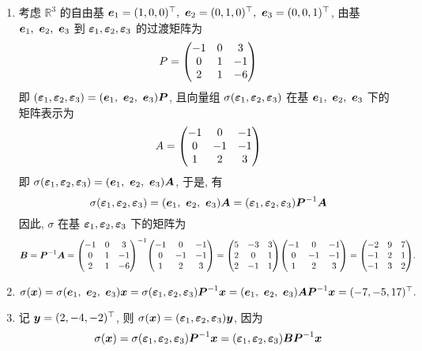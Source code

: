 \begin{solution}
    \begin{enumerate}[label=(\arabic{*})]
        \item 考虑 $\mathbb{R}^3$ 的自由基 $\vb*{e}_1=(1,0,0)^\top,~\vb*{e}_2=(0,1,0)^\top,~\vb*{e}_3=(0,0,1)^\top$, 由基 $\vb*{e}_1,~\vb*{e}_2,~\vb*{e}_3$ 到 $\vb*{\varepsilon}_1,\vb*{\varepsilon}_2,\vb*{\varepsilon}_3$ 的过渡矩阵为
              $$P=\mqty(-1&0&3\\0&1&-1\\2&1&-6)$$
              即 $(\vb*{\varepsilon}_1,\vb*{\varepsilon}_2,\vb*{\varepsilon}_3)=(\vb*{e}_1,~\vb*{e}_2,~\vb*{e}_3)\vb*{P}$, 且向量组 $\sigma(\vb*{\varepsilon}_1,\vb*{\varepsilon}_2,\vb*{\varepsilon}_3)$ 在基 $\vb*{e}_1,~\vb*{e}_2,~\vb*{e}_3$ 下的矩阵表示为
              $$A=\mqty(-1&0&-1\\0&-1&-1\\1&2&3)$$
              即 $\sigma(\vb*{\varepsilon}_1,\vb*{\varepsilon}_2,\vb*{\varepsilon}_3)=(\vb*{e}_1,~\vb*{e}_2,~\vb*{e}_3)\vb*{A}$, 于是, 有
              $$\sigma(\vb*{\varepsilon}_1,\vb*{\varepsilon}_2,\vb*{\varepsilon}_3)=(\vb*{e}_1,~\vb*{e}_2,~\vb*{e}_3)\vb*{A}=(\vb*{\varepsilon}_1,\vb*{\varepsilon}_2,\vb*{\varepsilon}_3)\vb*{P}^{-1}\vb*{A}$$
              因此, $\sigma$ 在基 $\vb*{\varepsilon}_1,\vb*{\varepsilon}_2,\vb*{\varepsilon}_3$ 下的矩阵为
              $$\vb*{B}=\vb*{P}^{-1}\vb*{A}=\mqty(-1&0&3\\0&1&-1\\2&1&-6)^{-1}\mqty(-1&0&-1\\0&-1&-1\\1&2&3)=\mqty(5&-3&3\\2&0&1\\2&-1&1)\mqty(-1&0&-1\\0&-1&-1\\1&2&3)=\mqty(-2&9&7\\-1&2&1\\-1&3&2).$$
        \item $\sigma(\vb*{x})=\sigma(\vb*{e}_1,~\vb*{e}_2,~\vb*{e}_3)\vb*{x}=\sigma(\vb*{\varepsilon}_1,\vb*{\varepsilon}_2,\vb*{\varepsilon}_3)\vb*{P}^{-1}\vb*{x}=(\vb*{e}_1,~\vb*{e}_2,~\vb*{e}_3)\vb*{AP}^{-1}\vb*{x}=(-7,-5,17)^\top.$
        \item 记 $\vb*{y}=(2,-4,-2)^\top$, 则 $\sigma(\vb*{x})=(\vb*{\varepsilon}_1,\vb*{\varepsilon}_2,\vb*{\varepsilon}_3)\vb*{y}$, 因为
              $$\sigma(\vb*{x})=\sigma(\vb*{\varepsilon}_1,\vb*{\varepsilon}_2,\vb*{\varepsilon}_3)\vb*{P}^{-1}\vb*{x}=(\vb*{\varepsilon}_1,\vb*{\varepsilon}_2,\vb*{\varepsilon}_3)\vb*{BP}^{-1}\vb*{x}$$

\end{enumerate}
\end{solution}
